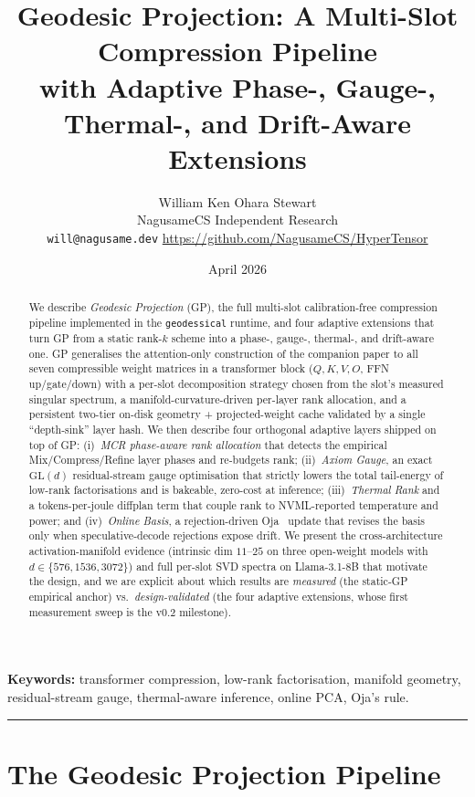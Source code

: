 \documentclass[11pt]{article}
\title{\textbf{Geodesic Projection: A Multi-Slot Compression Pipeline\\
with Adaptive Phase-, Gauge-, Thermal-, and Drift-Aware Extensions}}
\author{William Ken Ohara Stewart\\
\small NagusameCS Independent Research\\
\small \texttt{will@nagusame.dev} \quad \url{https://github.com/NagusameCS/HyperTensor}}
\date{April 2026}
\begin{document}
\maketitle
\hypertensorbanner

\begin{abstract}
\noindent
We describe \emph{Geodesic Projection} (GP), the full multi-slot
calibration-free compression pipeline implemented in the
\texttt{geodessical} runtime, and four adaptive extensions that turn GP from a
static rank-$k$ scheme into a phase-, gauge-, thermal-, and drift-aware one.
GP generalises the attention-only construction of the companion paper
to all seven compressible weight matrices in a transformer block
(\(Q,K,V,O\), FFN up/gate/down) with a per-slot decomposition strategy
chosen from the slot's measured singular spectrum, a manifold-curvature-driven
per-layer rank allocation, and a persistent two-tier on-disk geometry +
projected-weight cache validated by a single ``depth-sink'' layer hash.
We then describe four orthogonal adaptive layers shipped on top of GP:
(i)~\emph{MCR phase-aware rank allocation} that detects the empirical
Mix/Compress/Refine layer phases and re-budgets rank;
(ii)~\emph{Axiom Gauge}, an exact $\mathrm{GL}(d)$ residual-stream gauge
optimisation that strictly lowers the total tail-energy of low-rank
factorisations and is bakeable, zero-cost at inference;
(iii)~\emph{Thermal Rank} and a tokens-per-joule diffplan term that couple
rank to NVML-reported temperature and power; and
(iv)~\emph{Online Basis}, a rejection-driven Oja~\cite{oja1982} update that
revises the basis only when speculative-decode rejections expose drift.
We present the cross-architecture activation-manifold evidence
(intrinsic dim $11$--$25$ on three open-weight models with $d\in\{576,1536,3072\}$)
and full per-slot SVD spectra on Llama-3.1-8B that motivate the design,
and we are explicit about which results are \emph{measured} (the static-GP
empirical anchor) vs.\ \emph{design-validated} (the four adaptive
extensions, whose first measurement sweep is the v0.2 milestone).
\end{abstract}

\noindent\textbf{Keywords:} transformer compression, low-rank factorisation,
manifold geometry, residual-stream gauge, thermal-aware inference, online PCA,
Oja's rule.

\tableofcontents
\bigskip\hrule\bigskip

\part{The Geodesic Projection Pipeline}
\end{document}

